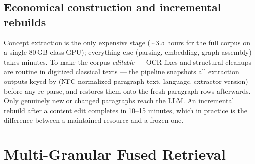 \documentclass[11pt,a4paper]{article}
\begin{document}
\subsection{Economical construction and incremental rebuilds}
\label{sec:build}

Concept extraction is the only expensive stage ($\sim$3.5 hours for the
full corpus on a single 80\,GB-class GPU); everything else (parsing,
embedding, graph assembly) takes minutes. To make the corpus
\emph{editable} --- OCR fixes and structural cleanups are routine in
digitized classical texts --- the pipeline snapshots all extraction
outputs keyed by (NFC-normalized paragraph text, language, extractor
version) before any re-parse, and restores them onto the fresh paragraph
rows afterwards. Only genuinely new or changed paragraphs reach the LLM.
An incremental rebuild after a content edit completes in 10--15 minutes,
which in practice is the difference between a maintained resource and a
frozen one.

\section{Multi-Granular Fused Retrieval}
\label{sec:retrieval}
\end{document}
